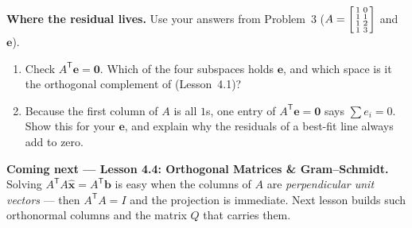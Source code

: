 \documentclass[10pt]{article}
\newcommand{\xx}{\mathbf{x}}
\newcommand{\bb}{\mathbf{b}}
\newcommand{\ee}{\mathbf{e}}
\newcommand{\zero}{\mathbf{0}}
\newcommand{\T}{\mathsf{T}}
\begin{document}
\begin{extensionbox}
\textbf{Where the residual lives.} Use your answers from Problem~3
($A=\begin{bsmallmatrix} 1&0\\1&1\\1&2\\1&3 \end{bsmallmatrix}$ and $\ee$).
\begin{enumerate}[label=(\alph*), leftmargin=1.8em, itemsep=5pt]
  \item Check $A^{\T}\ee=\zero$. Which of the four subspaces holds $\ee$, and which space is it the
        orthogonal complement of (Lesson~4.1)?
  \item Because the first column of $A$ is all $1$s, one entry of $A^{\T}\ee=\zero$ says $\sum e_i=0$. Show
        this for your $\ee$, and explain why the residuals of a best-fit line always add to zero.
\end{enumerate}
\end{extensionbox}

\begin{spiralbox}
\textbf{Coming next --- Lesson 4.4: Orthogonal Matrices \& Gram--Schmidt.} Solving $A^{\T}A\hat{\xx}=A^{\T}\bb$
is easy when the columns of $A$ are \emph{perpendicular unit vectors} --- then $A^{\T}A=I$ and the
projection is immediate. Next lesson builds such orthonormal columns and the matrix $Q$ that carries them.
\end{spiralbox}
\end{document}
